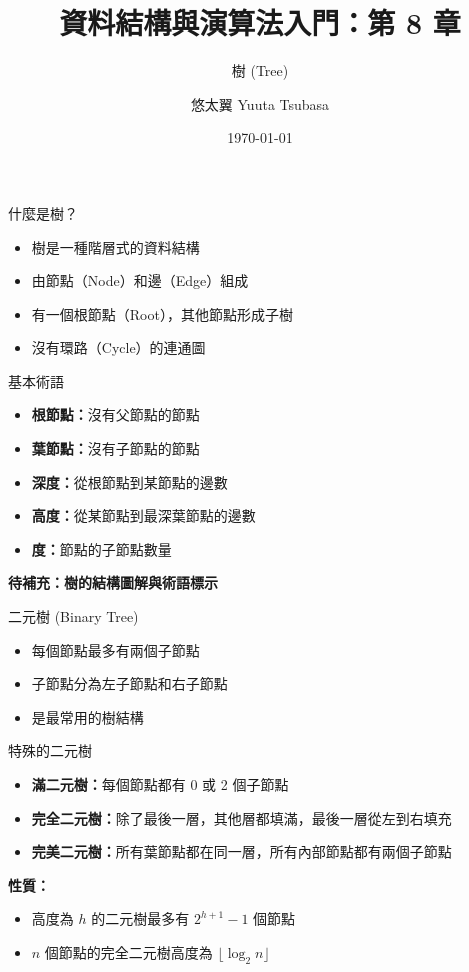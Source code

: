 \documentclass{beamer}
\begin{document}
\title{資料結構與演算法入門：第 8 章}
\subtitle{樹 (Tree)}
\author{悠太翼 Yuuta Tsubasa}
\date{\today}

\frame{\titlepage}

\begin{frame}{什麼是樹？}
\begin{itemize}
    \item 樹是一種階層式的資料結構
    \item 由節點（Node）和邊（Edge）組成
    \item 有一個根節點（Root），其他節點形成子樹
    \item 沒有環路（Cycle）的連通圖
\end{itemize}

\vspace{1em}
\begin{block}{基本術語}
\begin{itemize}
    \item \textbf{根節點：}沒有父節點的節點
    \item \textbf{葉節點：}沒有子節點的節點
    \item \textbf{深度：}從根節點到某節點的邊數
    \item \textbf{高度：}從某節點到最深葉節點的邊數
    \item \textbf{度：}節點的子節點數量
\end{itemize}
\end{block}

\vspace{1em}
\begin{center}
\textbf{待補充：樹的結構圖解與術語標示}
\end{center}
\end{frame}

\begin{frame}{二元樹 (Binary Tree)}
\begin{itemize}
    \item 每個節點最多有兩個子節點
    \item 子節點分為左子節點和右子節點
    \item 是最常用的樹結構
\end{itemize}

\vspace{1em}
\begin{block}{特殊的二元樹}
\begin{itemize}
    \item \textbf{滿二元樹：}每個節點都有 0 或 2 個子節點
    \item \textbf{完全二元樹：}除了最後一層，其他層都填滿，最後一層從左到右填充
    \item \textbf{完美二元樹：}所有葉節點都在同一層，所有內部節點都有兩個子節點
\end{itemize}
\end{block}

\vspace{1em}
\textbf{性質：}
\begin{itemize}
    \item 高度為 $h$ 的二元樹最多有 $2^{h+1} - 1$ 個節點
    \item $n$ 個節點的完全二元樹高度為 $\lfloor \log_2 n \rfloor$
\end{itemize}
\end{frame}
\end{document}
